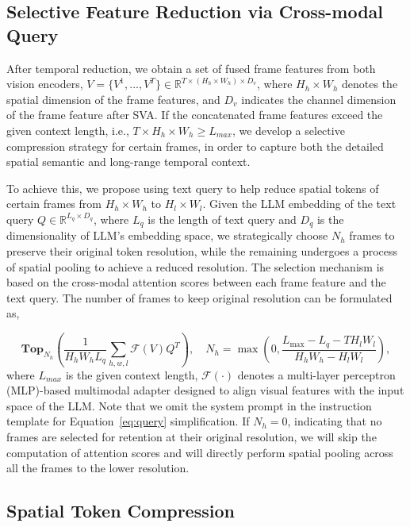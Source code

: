 \subsection{Selective Feature Reduction via Cross-modal Query}
\label{sec:query}

After temporal reduction, we obtain a set of fused frame features from both vision encoders, $V=\{V^1,...,V^T\} \in \mathbb{R}^{T\times (H_{h}\times W_{h}) \times D_v}$, where $H_{h}\times W_{h}$ denotes the spatial dimension of the frame features, and $D_v$ indicates the channel dimension of the frame feature after SVA. If the concatenated frame features exceed the given context length, i.e., $T\times H_h\times W_h \ge L_{max}$, we develop a selective compression strategy for certain frames, in order to capture both the detailed spatial semantic and long-range temporal context.

To achieve this, we propose using text query to help reduce spatial tokens of certain frames from $H_{h}\times W_{h}$ to $H_{l}\times W_{l}$. Given the LLM embedding of the text query $Q \in \mathbb{R}^{L_q\times D_q}$, where $L_q$ is the length of text query and $D_q$ is the dimensionality of LLM's embedding space, we strategically choose $N_h$ frames to preserve their original token resolution, while the remaining undergoes a process of spatial pooling to achieve a reduced resolution. The selection mechanism is based on the cross-modal attention scores between each frame feature and the text query. The number of frames to keep original resolution can be formulated as, 

\begin{equation}\label{eq:query}
    \mathbf{Top}_{N_h} \left (\frac{1}{H_hW_hL_q} \sum_{h,w,l}\mathcal{F}(V)Q^T \right ), \quad N_h = \max\left (0, \frac{L_{\text{max}} - L_q - T H_l W_l}{H_hW_h - H_lW_l}\right ),
\end{equation}
where $L_{max}$ is the given context length, $\mathcal{F}(\cdot)$ denotes a multi-layer perceptron (MLP)-based multimodal adapter designed to align visual features with the input space of the LLM. Note that we omit the system prompt in the instruction template for Equation~\ref{eq:query} simplification. If $N_h=0$, indicating that no frames are selected for retention at their original resolution, we will skip the computation of attention scores and will directly perform spatial pooling across all the frames to the lower resolution.

\subsection{Spatial Token Compression}\label{sec:prune}

